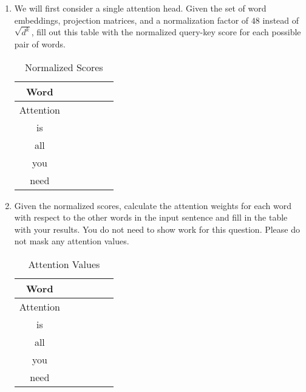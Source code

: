 \documentclass[12pt, letterpaper]{article}
\begin{document}
\begin{enumerate}
 \item We will first consider a single attention head. Given the set of word embeddings, projection matrices, and a normalization factor of $48$ instead of $\sqrt{d^k}$, fill out this table with the normalized query-key score for each possible pair of words.


\begin{table}[H]
\begin{center}
\begin{tabular}{ |c|c|c|c|c|c| } 
\hline
 Word  &  \multicolumn{1}{c}{} \hspace{0.5cm}  & \multicolumn{1}{c}{} \hspace{0.5cm}  & \multicolumn{1}{c}{} \hspace{0.5cm}  &  \multicolumn{1}{c}{}\hspace{0.5cm}  &  \hspace{0.5cm}  \\
\hline
Attention &    &   &   &   &  \\
\hline
is        &    &   &   &   &  \\
\hline
all       &    &   &   &   &  \\
\hline
you       &    &   &   &   &  \\
\hline
need      &    &   &   &   &  \\
\hline
\end{tabular}
\caption{Normalized Scores}
\end{center}
\end{table}

\item Given the normalized scores, calculate the attention weights for each word with respect to the other words in the input sentence and fill in the table with your results. You do not need to show work for this question. Please do not mask any attention values.

\begin{table}[H]
\begin{center}
\begin{tabular}{ |c|c|c|c|c|c| } 
\hline
 Word  &  \multicolumn{1}{c}{} \hspace{0.5cm}  & \multicolumn{1}{c}{} \hspace{0.5cm}  & \multicolumn{1}{c}{} \hspace{0.5cm}  &  \multicolumn{1}{c}{}\hspace{0.5cm}  &  \hspace{0.5cm}  \\
\hline
Attention &    &   &   &   &  \\
\hline
is        &    &   &   &   &  \\
\hline
all       &    &   &   &   &  \\
\hline
you       &    &   &   &   &  \\
\hline
need      &    &   &   &   &  \\
\hline
\end{tabular}
\caption{Attention Values}
\end{center}
\end{table}


\end{enumerate}
\end{document}
